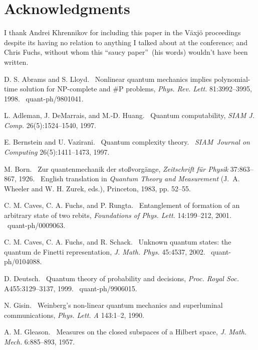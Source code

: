 \documentclass{article}%
\begin{document}
\section*{Acknowledgments}

I thank Andrei Khrennikov for including this paper in the V\"{a}xj\"{o}
proceedings despite its having no relation to anything I talked about at the
conference; and Chris Fuchs, without whom this \textquotedblleft saucy
paper\textquotedblright\ (his words) wouldn't have been written.

\begin{thebibliography}{9}                                                                                                %

D. S. Abrams and S. Lloyd. \ Nonlinear quantum mechanics implies
polynomial-time solution for NP-complete and \#P problems, \textit{Phys. Rev.
Lett.} 81:3992--3995, 1998. \ quant-ph/9801041.

L. Adleman, J. DeMarrais, and M.-D. Huang. \ Quantum
computability, \textit{SIAM J. Comp.} 26(5):1524--1540, 1997.

E. Bernstein and U. Vazirani. \ Quantum complexity theory.
\ \textit{SIAM\ Journal on Computing} 26(5):1411--1473, 1997.

M. Born. \ Zur quantenmechanik der sto\ss vorg\"{a}nge,
\textit{Zeitschrift f\"{u}r Physik} 37:863--867, 1926. \ English translation
in \textit{Quantum Theory and Measurement} (J.\ A. Wheeler and W. H. Zurek,
eds.), Princeton, 1983, pp. 52--55.

C. M. Caves, C. A. Fuchs, and P. Rungta. \ Entanglement of
formation of an arbitrary state of two rebits, \textit{Foundations of Phys.
Lett.} 14:199--212, 2001. \ quant-ph/0009063.

C. M. Caves, C. A. Fuchs, and R. Schack. \ Unknown quantum
states: the quantum de Finetti representation, \textit{J. Math. Phys.}
45:4537, 2002. \ quant-ph/0104088.

D. Deutsch. \ Quantum theory of probability and decisions,
\textit{Proc. Royal Soc.} A455:3129--3137, 1999. \ quant-ph/9906015.

N. Gisin. \ Weinberg's non-linear quantum mechanics and
superluminal communications, \textit{Phys. Lett. A} 143:1--2, 1990.

A. M. Gleason. \ Measures on the closed subspaces of a
Hilbert space, \textit{J. Math. Mech.} 6:885--893, 1957.


\end{thebibliography}
\end{document}
